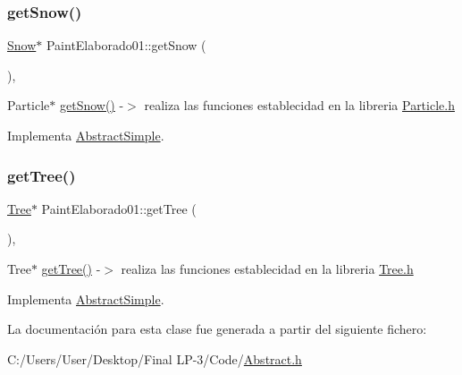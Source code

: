\subsubsection{\texorpdfstring{getSnow()}{getSnow()}}
{\footnotesize\ttfamily \mbox{\hyperlink{class_snow}{Snow}}$\ast$ Paint\+Elaborado01\+::get\+Snow (\begin{DoxyParamCaption}{ }\end{DoxyParamCaption})\hspace{0.3cm}{\ttfamily [inline]}, {\ttfamily [virtual]}}

Particle$\ast$ \mbox{\hyperlink{class_paint_elaborado01_a0c42906a02e9f8081521dd7706f63e0f}{get\+Snow()}} -\/$>$ realiza las funciones establecidad en la libreria \mbox{\hyperlink{_particle_8h}{Particle.\+h}} 

Implementa \mbox{\hyperlink{class_abstract_simple_aad971de50be686f491109651a387ce5e}{Abstract\+Simple}}.

\mbox{\label{class_paint_elaborado01_a1b6bce9b1cd0bf093eff083e1c2e05f9}} 
\subsubsection{\texorpdfstring{getTree()}{getTree()}}
{\footnotesize\ttfamily \mbox{\hyperlink{class_tree}{Tree}}$\ast$ Paint\+Elaborado01\+::get\+Tree (\begin{DoxyParamCaption}{ }\end{DoxyParamCaption})\hspace{0.3cm}{\ttfamily [inline]}, {\ttfamily [virtual]}}

Tree$\ast$ \mbox{\hyperlink{class_paint_elaborado01_a1b6bce9b1cd0bf093eff083e1c2e05f9}{get\+Tree()}} -\/$>$ realiza las funciones establecidad en la libreria \mbox{\hyperlink{_tree_8h}{Tree.\+h}} 

Implementa \mbox{\hyperlink{class_abstract_simple_ad90f5d7d3415a29af8bbf10ad8d89772}{Abstract\+Simple}}.



La documentación para esta clase fue generada a partir del siguiente fichero\+:\begin{DoxyCompactItemize}
\item 
C\+:/\+Users/\+User/\+Desktop/\+Final L\+P-\/3/\+Code/\mbox{\hyperlink{_abstract_8h}{Abstract.\+h}}\end{DoxyCompactItemize}
